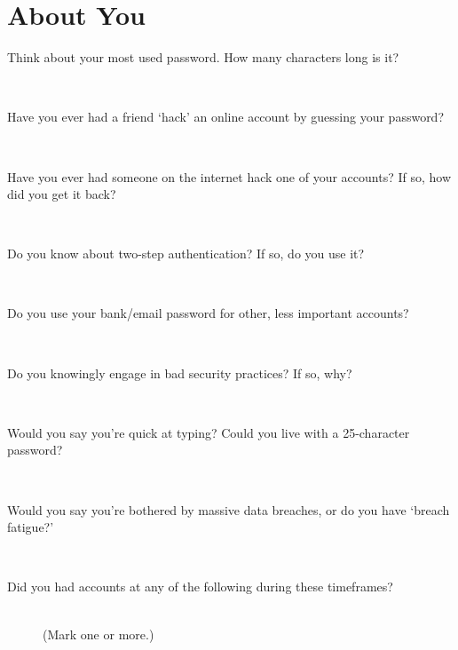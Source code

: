\documentclass{article}
\begin{document}
  \section{About You}
    \begin{description}
      \item[Think about your most used password. How many characters long is it?] \mbox{}\\ \underline{\hspace{10cm}}
      \item[Have you ever had a friend `hack' an online account by guessing your password?] \mbox{}\\ \underline{\hspace{10cm}}
      \item[Have you ever had someone on the internet hack one of your accounts? If so, how did you get it back?]  \underline{\hspace{16cm}} \\ \underline{\hspace{16cm}}
      \item[Do you know about two-step authentication? If so, do you use it?] \mbox{}\\ \underline{\hspace{10cm}}
      \item[Do you use your bank/email password for other, less important accounts?] \mbox{}\\ \underline{\hspace{10cm}}
      \item[Do you knowingly engage in bad security practices? If so, why?] \mbox{}\\ \underline{\hspace{10cm}}
      \item[Would you say you're quick at typing? Could you live with a 25-character password?] \mbox{}\\ \underline{\hspace{10cm}}
      \item[Would you say you're bothered by massive data breaches, or do you have `breach fatigue?'] \mbox{}\\ \underline{\hspace{10cm}}
      \item[Did you had accounts at any of the following during these timeframes?]
        \mbox{}\\ {\small (Mark one or more.)}
        \begin{itemize}
          \renewcommand{\labelitemi}{\scriptsize$\circ$}

\end{itemize}
\end{description}
\end{document}
